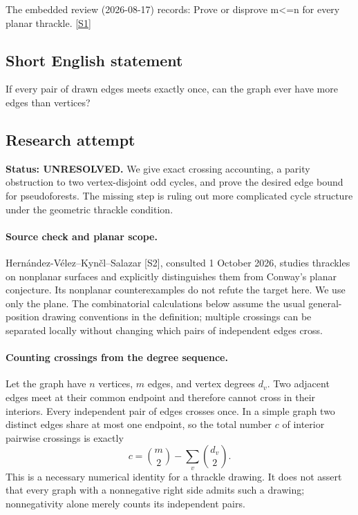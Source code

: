 \documentclass[11pt,a4paper]{article}
\newcommand{\sref}[2]{\hyperlink{source:#1:#2}{[S#2]}}
\begin{document}
The embedded review (2026-08-17) records: Prove or disprove m<=n for every planar thrackle. \sref{statement}{1}

\subsection{Short English statement}

If every pair of drawn edges meets exactly once, can the graph ever have more edges than vertices?

\subsection{Research attempt}
\textbf{Status: UNRESOLVED.} We give exact crossing accounting, a parity obstruction to two vertex-disjoint odd cycles, and prove the desired edge bound for pseudoforests. The missing step is ruling out more complicated cycle structure under the geometric thrackle condition.

\paragraph{Source check and planar scope.}
Hern\'andez-V\'elez--Kyn\v cl--Salazar [S2], consulted 1 October 2026, studies thrackles on nonplanar surfaces and explicitly distinguishes them from Conway's planar conjecture. Its nonplanar counterexamples do not refute the target here. We use only the plane. The combinatorial calculations below assume the usual general-position drawing conventions in the definition; multiple crossings can be separated locally without changing which pairs of independent edges cross.

\paragraph{Counting crossings from the degree sequence.}
Let the graph have $n$ vertices, $m$ edges, and vertex degrees $d_v$. Two adjacent edges meet at their common endpoint and therefore cannot cross in their interiors. Every independent pair of edges crosses once. In a simple graph two distinct edges share at most one endpoint, so the total number $c$ of interior pairwise crossings is exactly
\[
c=\binom m2-\sum_v\binom{d_v}{2}.
\]
This is a necessary numerical identity for a thrackle drawing. It does not assert that every graph with a nonnegative right side admits such a drawing; nonnegativity alone merely counts its independent pairs.
\end{document}
